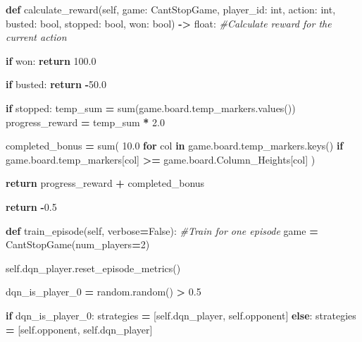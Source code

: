 \documentclass[12pt]{article}
\newenvironment{Shaded}{\begin{snugshade}}{\end{snugshade}}
\newcommand{\BuiltInTok}[1]{#1}
\newcommand{\CommentTok}[1]{\textcolor[rgb]{0.56,0.35,0.01}{\textit{#1}}}
\newcommand{\ControlFlowTok}[1]{\textcolor[rgb]{0.13,0.29,0.53}{\textbf{#1}}}
\newcommand{\DecValTok}[1]{\textcolor[rgb]{0.00,0.00,0.81}{#1}}
\newcommand{\FloatTok}[1]{\textcolor[rgb]{0.00,0.00,0.81}{#1}}
\newcommand{\KeywordTok}[1]{\textcolor[rgb]{0.13,0.29,0.53}{\textbf{#1}}}
\newcommand{\NormalTok}[1]{#1}
\newcommand{\OperatorTok}[1]{\textcolor[rgb]{0.81,0.36,0.00}{\textbf{#1}}}
\newcommand{\VariableTok}[1]{\textcolor[rgb]{0.00,0.00,0.00}{#1}}
\begin{document}
\begin{thesis}
\begin{Shaded}
\begin{Highlighting}[]
    \KeywordTok{def}\NormalTok{ calculate\_reward(}\VariableTok{self}\NormalTok{, game: CantStopGame, player\_id: }\BuiltInTok{int}\NormalTok{, }
\NormalTok{                        action: }\BuiltInTok{int}\NormalTok{, busted: }\BuiltInTok{bool}\NormalTok{, stopped: }\BuiltInTok{bool}\NormalTok{, won: }\BuiltInTok{bool}\NormalTok{) }
                        \OperatorTok{{-}\textgreater{}} \BuiltInTok{float}\NormalTok{:}
        \CommentTok{\#Calculate reward for the current action}
        
        \ControlFlowTok{if}\NormalTok{ won:}
            \ControlFlowTok{return} \FloatTok{100.0}
        
        \ControlFlowTok{if}\NormalTok{ busted:}
            \ControlFlowTok{return} \OperatorTok{{-}}\FloatTok{50.0}
        
        \ControlFlowTok{if}\NormalTok{ stopped:}
\NormalTok{            temp\_sum }\OperatorTok{=} \BuiltInTok{sum}\NormalTok{(game.board.temp\_markers.values())}
\NormalTok{            progress\_reward }\OperatorTok{=}\NormalTok{ temp\_sum }\OperatorTok{*} \FloatTok{2.0}
            
\NormalTok{            completed\_bonus }\OperatorTok{=} \BuiltInTok{sum}\NormalTok{(}
                \FloatTok{10.0} \ControlFlowTok{for}\NormalTok{ col }\KeywordTok{in}\NormalTok{ game.board.temp\_markers.keys()}
                \ControlFlowTok{if}\NormalTok{ game.board.temp\_markers[col] }\OperatorTok{\textgreater{}=} 
\NormalTok{                                              game.board.Column\_Heights[col]}
\NormalTok{            )}
            
            \ControlFlowTok{return}\NormalTok{ progress\_reward }\OperatorTok{+}\NormalTok{ completed\_bonus}
        
        \ControlFlowTok{return} \OperatorTok{{-}}\FloatTok{0.5}
    
    \KeywordTok{def}\NormalTok{ train\_episode(}\VariableTok{self}\NormalTok{, verbose}\OperatorTok{=}\VariableTok{False}\NormalTok{):}
        \CommentTok{\#Train for one episode}
\NormalTok{        game }\OperatorTok{=}\NormalTok{ CantStopGame(num\_players}\OperatorTok{=}\DecValTok{2}\NormalTok{)}
        
        \VariableTok{self}\NormalTok{.dqn\_player.reset\_episode\_metrics()}

\NormalTok{        dqn\_is\_player\_0 }\OperatorTok{=}\NormalTok{ random.random() }\OperatorTok{\textgreater{}} \FloatTok{0.5}
        
        \ControlFlowTok{if}\NormalTok{ dqn\_is\_player\_0:}
\NormalTok{            strategies }\OperatorTok{=}\NormalTok{ [}\VariableTok{self}\NormalTok{.dqn\_player, }\VariableTok{self}\NormalTok{.opponent]}
        \ControlFlowTok{else}\NormalTok{:}
\NormalTok{            strategies }\OperatorTok{=}\NormalTok{ [}\VariableTok{self}\NormalTok{.opponent, }\VariableTok{self}\NormalTok{.dqn\_player]}
        

\end{Highlighting}
\end{Shaded}
\end{thesis}
\end{document}
